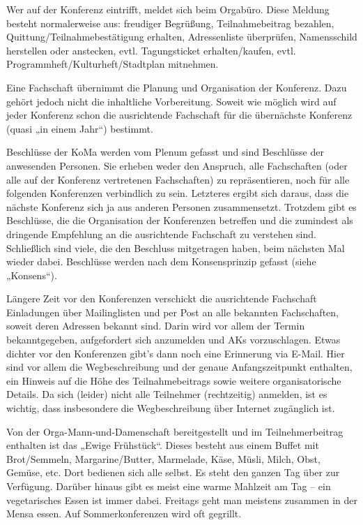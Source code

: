 \documentclass{neulingsheft}
\begin{document}
{\begin{description}
	Wer auf der Konferenz eintrifft, meldet sich beim Orgabüro.  Diese Meldung
	besteht normalerweise aus: freudiger Begrüßung, Teilnahmebeitrag bezahlen,
	Quittung/Teilnahmebestätigung erhalten, Adressenliste überprüfen, Namensschild
	herstellen oder anstecken, evtl. Tagungsticket erhalten/kaufen, evtl.
	Programmheft/Kulturheft/Stadtplan mitnehmen.

\item[Ausrichtende Fachschaft] Eine Fachschaft übernimmt die Planung und
	Organisation der Konferenz. Dazu gehört jedoch nicht die inhaltliche
	Vorbereitung. Soweit wie möglich wird auf jeder Konferenz schon die
	ausrichtende Fachschaft für die übernächste Konferenz (quasi „in einem
	Jahr“) bestimmt.

\item[Beschlüsse] Beschlüsse der KoMa werden vom Plenum gefasst und sind
	Beschlüsse der anwesenden Personen. Sie erheben weder den Anspruch, alle
	Fachschaften (oder alle auf der Konferenz vertretenen Fachschaften) zu
	repräsentieren, noch für alle folgenden Konferenzen verbindlich zu sein.
	Letzteres ergibt sich daraus, dass die nächste Konferenz sich ja aus
	anderen Personen zusammensetzt. Trotzdem gibt es Beschlüsse, die die
	Organisation der Konferenzen betreffen und die zumindest als dringende
	Empfehlung an die ausrichtende Fachschaft zu verstehen sind. Schließlich
	sind viele, die den Beschluss mitgetragen haben, beim nächsten Mal wieder
	dabei. Beschlüsse werden nach dem Konsensprinzip gefasst (siehe „Konsens“).

\item[Einladung] Längere Zeit vor den Konferenzen verschickt die ausrichtende
	Fachschaft Einladungen über Mailinglisten und per Post an alle bekannten
	Fachschaften, soweit deren Adressen bekannt sind. Darin wird vor allem der
	Termin bekanntgegeben, aufgefordert sich anzumelden und AKs vorzuschlagen.
	Etwas dichter vor den Konferenzen gibt’s dann noch eine Erinnerung via
	E-Mail. Hier sind vor allem die Wegbeschreibung und der genaue
	Anfangszeitpunkt enthalten, ein Hinweis auf die Höhe des Teilnahmebeitrags
	sowie weitere organisatorische Details. Da sich (leider) nicht alle
	Teilnehmer (rechtzeitig) anmelden, ist es wichtig, dass insbesondere die
	Wegbeschreibung über Internet zugänglich ist.

\item[Essen/„Ewiges Frühstück“] Von der Orga-Mann-und-Damenschaft
	bereitgestellt und im Teilnehmerbeitrag enthalten ist das „Ewige
	Frühstück“. Dieses besteht aus einem Buffet mit Brot/Semmeln,
	Margarine/Butter, Marmelade, Käse, Müsli, Milch, Obst, Gemüse, etc. Dort
	bedienen sich alle selbst. Es steht den ganzen Tag über zur Verfügung.
	Darüber hinaus gibt es meist eine warme Mahlzeit am Tag – ein vegetarisches
	Essen ist immer dabei. Freitags geht man meistens zusammen in der Mensa
	essen. Auf Sommerkonferenzen wird oft gegrillt.


\end{description}}
\end{document}

